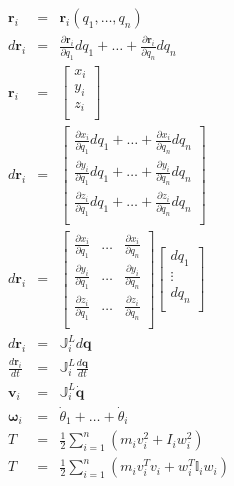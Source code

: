 \documentclass[a4paper]{article}
\begin{document}
\begin{eqnarray*}
\textbf{r}_i & = & \textbf{r}_i(q_1,\dots,q_n)\\
d\textbf{r}_i & = & \frac{\partial \textbf{r}_i}{\partial q_1} dq_1 + \dots + \frac{\partial \textbf{r}_i}{\partial q_n} dq_n\\
\textbf{r}_i & = & \begin{bmatrix}
		x_i\\
        y_i\\
        z_i\\
        \end{bmatrix}\\
d\textbf{r}_i & = &  \begin{bmatrix}
		\frac{\partial x_i}{\partial q_1} dq_1 + \dots + \frac{\partial x_i}{\partial q_n} dq_n\\
        \frac{\partial y_i}{\partial q_1} dq_1 + \dots + \frac{\partial y_i}{\partial q_n} dq_n\\
        \frac{\partial z_i}{\partial q_1} dq_1 + \dots + \frac{\partial z_i}{\partial q_n} dq_n\\
        \end{bmatrix}\\
d\textbf{r}_i & = & \begin{bmatrix}
		\frac{\partial x_i}{\partial q_1} & \dots & \frac{\partial x_i}{\partial q_n}\\
        \frac{\partial y_i}{\partial q_1} & \dots & \frac{\partial y_i}{\partial q_n}\\
        \frac{\partial z_i}{\partial q_1} & \dots & \frac{\partial z_i}{\partial q_n}\\
        \end{bmatrix} \begin{bmatrix}
        dq_1\\
        \vdots\\
        dq_n\\
        \end{bmatrix}\\
d\textbf{r}_i & = & \mathbb{J}_i^L d\textbf{q}\\
\frac{d\textbf{r}_i}{dt} & = & \mathbb{J}_i^L\frac{d\textbf{q}}{dt}\\
\textbf{v}_i & = & \mathbb{J}_i^L \dot{\textbf{q}}\\
\mathbf{\omega}_i & = & \dot{\theta}_1 + \dots + \dot{\theta}_i \\
T & = & \frac{1}{2} \sum_{i=1}^{n} (m_i v_i^2 + I_i w_i^2)\\
T & = & \frac{1}{2} \sum_{i=1}^{n} (m_i v_i^T v_i + w_i^T \mathbb{I}_i w_i)\\

\end{eqnarray*}
\end{document}
